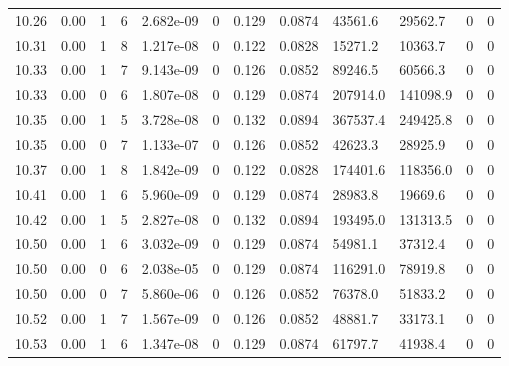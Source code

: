\documentclass[preview]{standalone}
\begin{document}
{{{{{{{{{{{{\begin{tabular}{L{1.2cm}C{1.2cm} C{0.3cm}C{0.5cm} C{1.4cm}C{1.4cm} C{1.4cm}C{1.4cm} C{1.6cm}C{1.6cm} C{1.6cm}C{1.6cm}}
  10.26  &  0.00  & 1     &  6 &  2.682e-09  & 0  &  0.129&   0.0874& 43561.6 & 29562.7   &  0 & 0  \\ 
  10.31  &  0.00  & 1     &  8 &  1.217e-08  & 0  &  0.122&   0.0828& 15271.2 & 10363.7   &  0 & 0  \\ 
  10.33  &  0.00  & 1     &  7 &  9.143e-09  & 0  &  0.126&   0.0852& 89246.5 & 60566.3   &  0 & 0  \\ 
  10.33  &  0.00  & 0     &  6 &  1.807e-08  & 0  &  0.129&   0.0874& 207914.0 & 141098.9   &  0 & 0  \\ 
  10.35  &  0.00  & 1     &  5 &  3.728e-08  & 0  &  0.132&   0.0894& 367537.4 & 249425.8   &  0 & 0  \\ 
  10.35  &  0.00  & 0     &  7 &  1.133e-07  & 0  &  0.126&   0.0852& 42623.3 & 28925.9   &  0 & 0  \\ 
  10.37  &  0.00  & 1     &  8 &  1.842e-09  & 0  &  0.122&   0.0828& 174401.6 & 118356.0   &  0 & 0  \\ 
  10.41  &  0.00  & 1     &  6 &  5.960e-09  & 0  &  0.129&   0.0874& 28983.8 & 19669.6   &  0 & 0  \\ 
  10.42  &  0.00  & 1     &  5 &  2.827e-08  & 0  &  0.132&   0.0894& 193495.0 & 131313.5   &  0 & 0  \\ 
  10.50  &  0.00  & 1     &  6 &  3.032e-09  & 0  &  0.129&   0.0874& 54981.1 & 37312.4   &  0 & 0  \\ 
  10.50  &  0.00  & 0     &  6 &  2.038e-05  & 0  &  0.129&   0.0874& 116291.0 & 78919.8   &  0 & 0  \\ 
  10.50  &  0.00  & 0     &  7 &  5.860e-06  & 0  &  0.126&   0.0852& 76378.0 & 51833.2   &  0 & 0  \\ 
  10.52  &  0.00  & 1     &  7 &  1.567e-09  & 0  &  0.126&   0.0852& 48881.7 & 33173.1   &  0 & 0  \\ 
  10.53  &  0.00  & 1     &  6 &  1.347e-08  & 0  &  0.129&   0.0874& 61797.7 & 41938.4   &  0 & 0  \\ 
\hline 
\end{tabular} 

}}}}}}}}}}}}
\end{document}
